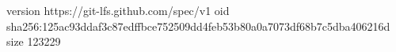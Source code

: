 version https://git-lfs.github.com/spec/v1
oid sha256:125ac93ddaf3c87edffbce752509dd4feb53b80a0a7073df68b7c5dba406216d
size 123229
